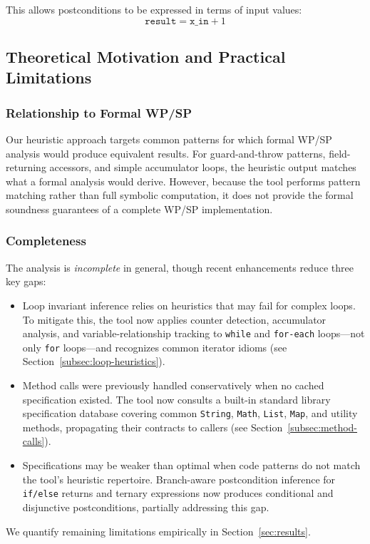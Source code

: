 This allows postconditions to be expressed in terms of input values:
\[
\texttt{result} = \texttt{x\_in} + 1
\]

\subsection{Theoretical Motivation and Practical Limitations}

\subsubsection{Relationship to Formal WP/SP}
Our heuristic approach targets common patterns for which formal WP/SP analysis would produce equivalent results. For guard-and-throw patterns, field-returning accessors, and simple accumulator loops, the heuristic output matches what a formal analysis would derive. However, because the tool performs pattern matching rather than full symbolic computation, it does not provide the formal soundness guarantees of a complete WP/SP implementation.

\subsubsection{Completeness}
The analysis is \emph{incomplete} in general, though recent enhancements reduce three key gaps:
\begin{itemize}
    \item Loop invariant inference relies on heuristics that may fail for complex loops. To mitigate this, the tool now applies counter detection, accumulator analysis, and variable-relationship tracking to \texttt{while} and \texttt{for-each} loops---not only \texttt{for} loops---and recognizes common iterator idioms (see Section~\ref{subsec:loop-heuristics}).
    \item Method calls were previously handled conservatively when no cached specification existed. The tool now consults a built-in standard library specification database covering common \texttt{String}, \texttt{Math}, \texttt{List}, \texttt{Map}, and utility methods, propagating their contracts to callers (see Section~\ref{subsec:method-calls}).
    \item Specifications may be weaker than optimal when code patterns do not match the tool's heuristic repertoire. Branch-aware postcondition inference for \texttt{if/else} returns and ternary expressions now produces conditional and disjunctive postconditions, partially addressing this gap.
\end{itemize}

We quantify remaining limitations empirically in Section~\ref{sec:results}.
